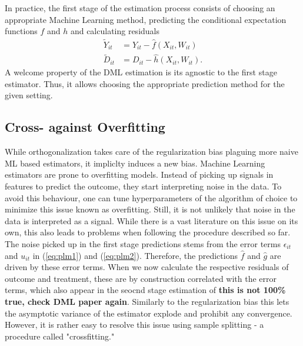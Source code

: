 In practice, the first stage of the estimation process consists of choosing an appropriate Machine Learning method, predicting the conditional expectation functions $f$ and $h$ and calculating residuals 
\begin{align*} 
    \tilde{Y}_{it}&=Y_{it}-\hat{f}(X_{it}, W_{it}) \\ 
    \tilde{D}_{it}&=D_{it}-\hat{h}(X_{it}, W_{it}).
\end{align*}
A welcome property of the DML estimation is its agnostic to the first stage estimator. Thus, it allows choosing the appropriate prediction method for the given setting. 

\subsection{Cross- against Overfitting} \label{sec:cross-fitting}
While orthogonalization takes care of the regularization bias plaguing more naive ML based estimators, it impliclty induces a new bias. Machine Learning estimators are prone to overfitting models. Instead of picking up signals in features to predict the outcome, they start interpreting noise in the data. To avoid this behaviour, one can tune hyperparameters of the algorithm of choice to minimize this issue known as overfitting. Still, it is not unlikely that noise in the data is interpreted as a signal. While there is a vast literature on this issue on its own, this also leads to problems when following the procedure described so far. \\
The noise picked up in the first stage predictions stems from the error terms $\epsilon_{it}$ and $u_{it}$ in (\ref{eq:plm1}) and (\ref{eq:plm2}). Therefore, the predictions $\hat{f}$ and $\hat{g}$ are driven by these error terms. When we now calculate the respective residuals of outcome and treatment, these are by construction correlated with the error terms, which also appear in the seocnd stage estimation of \textbf{this is not 100\% true, check DML paper again}. Similarly to the regularization bias this lets the asymptotic variance of the estimator explode and prohibit any convergence. However, it is rather easy to resolve this issue using sample splitting - a procedure called "crossfitting." \\ 
